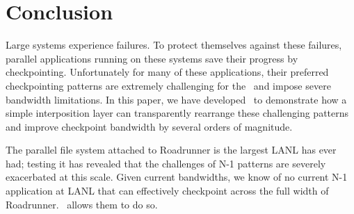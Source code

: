 \section{Conclusion}
\label{conclude}

Large systems experience failures.  To protect themselves against these
failures, parallel applications running on these systems save their progress by
checkpointing.  Unfortunately for many of these applications, their preferred
checkpointing patterns are extremely challenging for the \upfs\ and impose
severe bandwidth limitations.  In this paper, we have developed \plfs\ to
demonstrate how a simple interposition layer can transparently rearrange these
challenging patterns and improve checkpoint bandwidth by several orders of
magnitude.

The parallel file system attached to Roadrunner is the largest LANL has ever
had; testing it has revealed that the challenges of N-1 patterns are severely
exacerbated at this scale.  Given current bandwidths, we know of no current N-1
application at LANL that can effectively checkpoint across the full width of
Roadrunner.  \plfs\ allows them to do so. 

\clearpage
